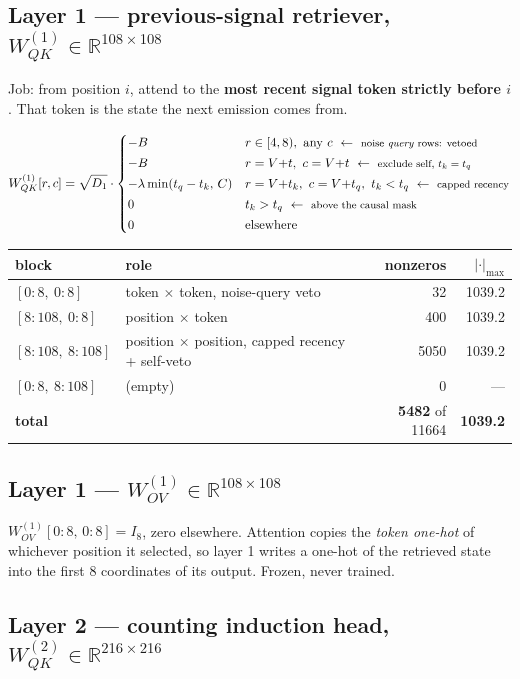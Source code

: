 \documentclass[11pt]{article}
\newcommand{\R}{\mathbb{R}}
\newcommand{\Wqk}{W_{QK}}
\newcommand{\Wov}{W_{OV}}
\newcommand{\rowlab}[1]{\ \leftarrow\ \text{\footnotesize #1}}
\begin{document}
\subsection{Layer 1 --- previous-signal retriever, $\Wqk^{(1)}\in\R^{108\times108}$}

Job: from position $i$, attend to the \textbf{most recent signal token strictly before $i$}.
That token is the state the next emission comes from.

\[
\Wqk^{(1)}[r,c]=\sqrt{D_1}\cdot\begin{cases}
-B & r\in[4,8),\ \text{any } c \rowlab{noise \emph{query} rows: vetoed}\\[2pt]
-B & r=V{+}t,\ c=V{+}t \rowlab{exclude self, $t_k=t_q$}\\[2pt]
-\lambda\min(t_q-t_k,\,C) & r=V{+}t_k,\ c=V{+}t_q,\ t_k<t_q \rowlab{capped recency}\\[2pt]
0 & t_k>t_q \rowlab{above the causal mask}\\[2pt]
0 & \text{elsewhere}
\end{cases}
\]

\begin{center}\small
\begin{tabular}{@{}llrr@{}}
\toprule
block & role & nonzeros & $|\cdot|_{\max}$ \\
\midrule
$[0{:}8,\ 0{:}8]$      & token $\times$ token, noise-query veto & 32 & 1039.2 \\
$[8{:}108,\ 0{:}8]$    & position $\times$ token & 400 & 1039.2 \\
$[8{:}108,\ 8{:}108]$  & position $\times$ position, capped recency + self-veto & 5050 & 1039.2 \\
$[0{:}8,\ 8{:}108]$    & (empty) & 0 & --- \\
\midrule
\textbf{total} & & \textbf{5482} of 11664 & \textbf{1039.2} \\
\bottomrule
\end{tabular}
\end{center}

\subsection{Layer 1 --- $\Wov^{(1)}\in\R^{108\times108}$}
$\Wov^{(1)}[0{:}8,\,0{:}8]=I_8$, zero elsewhere. Attention copies the \emph{token one-hot} of
whichever position it selected, so layer 1 writes a one-hot of the retrieved state into the first
8 coordinates of its output. Frozen, never trained.

\subsection{Layer 2 --- counting induction head, $\Wqk^{(2)}\in\R^{216\times216}$}
\end{document}
